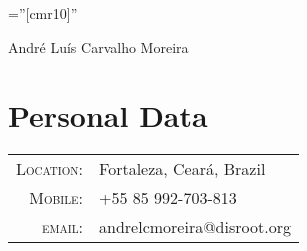 \documentclass[a4paper,10pt]{article}
\begin{document}

  \pagestyle{empty} %

  \font\fb=''[cmr10]'' %

  \par{\centering
  {\Huge André Luís \Huge{Carvalho} Moreira
  }\bigskip\par}

  \section{Personal Data}

  \begin{tabular}{rl}
    \textsc{Location:}   & Fortaleza, Ceará, Brazil \\
    \textsc{Mobile:}     & +55 85 992-703-813\\
    \textsc{email:}     & {andrelcmoreira@disroot.org}
  \end{tabular} \\

\end{document}
